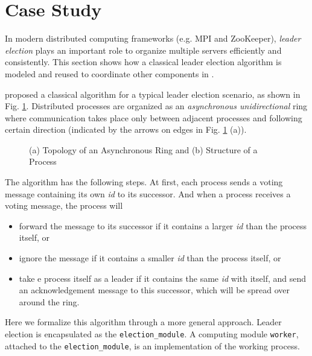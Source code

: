 \section{Case Study}
\label{sec:casestudy}

In modern distributed computing frameworks (e.g. MPI\cite{mpibook} and ZooKeeper\cite{JunqueiraZab2011}), \emph{leader election} plays an important role to organize multiple servers efficiently and consistently. This section shows how a classical leader election algorithm is modeled and reused to coordinate other components in \lang{}.

\cite{HagitDistributed2004} proposed a classical algorithm for a typical leader election scenario, as shown in Fig. \ref{fig:leaderelection}. Distributed processes are organized as an \emph{asynchronous unidirectional} ring where communication takes place only between adjacent processes and following certain direction (indicated by the arrows on edges in Fig. \ref{fig:leaderelection} (a)).

\begin{figure}
	\centering
	\resizebox{.8\textwidth}{!}{
        
    }
	\caption{(a) Topology of an Asynchronous Ring and (b) Structure of a Process}
	\label{fig:leaderelection}
\end{figure}

The algorithm has the following steps. At first, each process sends a voting message containing its own \emph{id} to its successor. And when a process receives a voting message, the process will
\begin{itemize}
	\item forward the message to its successor if it contains a larger \emph{id} than the process itself, or
	\item ignore the message if it contains a smaller \emph{id} than the process itself, or
	\item  take e process itself as a leader if it contains the same \emph{id} with itself, and send an acknowledgement message to this successor, which will be spread over around the ring.
\end{itemize} 


Here we formalize this algorithm through a more general approach. Leader election is encapsulated as the \texttt{election\_module}. A computing module \texttt{worker},  attached to the \texttt{election\_module}, is an implementation of the working process. 

